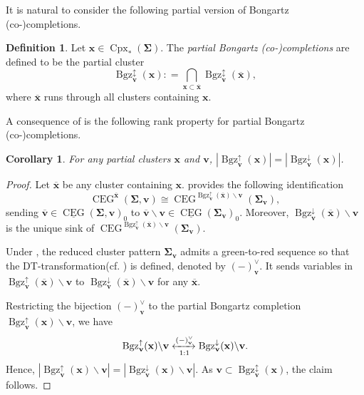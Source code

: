 \documentclass[11pt,reqno]{amsart}
\providecommand{\xlongleftrightarrow}[2][]{\xleftrightarrow[#1]{#2}}
\theoremstyle{plain}
\newtheorem{corollary}[theorem]{Corollary}
\theoremstyle{definition}
\newtheorem{definition}[theorem]{Definition}
\numberwithin{equation}{section}
\newcommand\<{\langle}
\renewcommand\>{\rangle}
\newcommand{\CEG}{\operatorname{CEG}} %
\newcommand{\uCEG}{\underline{\CEG}} %
\newcommand{\on}[1]{\operatorname{#1}}
\def\CCx{\on{Cpx}}   %
\def\vv{\mathbf{v}}
\def\seeds{\mathbf{\Sigma}}
\def\xx{\mathbf{x}}%
\newcommand{\Bgzp}[2]{\operatorname{Bgz}^{\uparrow}_{#2}(#1)}
\newcommand{\Bgzm}[2]{\operatorname{Bgz}^{\downarrow}_{#2}(#1)}
\newcommand{\Bgzpm}[2]{\operatorname{Bgz}^{\updownarrow}_{#2}(#1)}
\newcommand{\ol}[1]{\overline{#1}}
\newcommand{\DT}[1]{#1^{\vee}}
\begin{document}
It is natural to consider the following partial version of Bongartz (co-)completions.

\begin{definition}\label{def:parBgz}
Let $\xx\in\CCx_*(\seeds)$.
The \emph{partial Bongartz (co-)completions} are defined to be the partial cluster
\begin{equation}\label{eq:parBgz2}
    \Bgzpm{\xx}{\vv} \colon =\bigcap_{\xx\subset\ol{\xx}}\Bgzpm{\ol{\xx}}{\vv},
\end{equation}
where $\ol{\xx}$ runs through all clusters containing $\xx$.
\end{definition}

A consequence of  is the following rank property for partial Bongartz (co-)completions.

\begin{corollary}\label{cor:rank}
For any partial clusters $\xx$ and $\vv$, $|\Bgzp{\xx}{\vv}|=|\Bgzm{\xx}{\vv}|$.
\end{corollary}

\begin{proof}
Let $\ol{\xx}$ be any cluster containing $\xx$.
 provides the following identification
\[
\CEG^{\ol{\xx}}(\seeds,\vv)\cong\CEG^{\Bgzp{\ol{\xx}}{\vv}\backslash\vv}(\seeds_\vv),
\]
sending $\ol{\vv}\in\uCEG(\seeds,\vv)_0$ to $\ol{\vv}\backslash\vv\in\uCEG(\seeds_\vv)_0$.
Moreover, $\Bgzm{\ol{\xx}}{\vv}\backslash\vv$ is the unique sink of $\CEG^{\Bgzp{\ol{\xx}}{\vv}\backslash\vv}(\seeds_\vv)$.

Under , the reduced cluster pattern $\seeds_\vv$ admits a green-to-red sequence so that the DT-transformation(cf. ) is defined, denoted by $\DT{(-)_\vv}$.
It sends variables in $\Bgzp{\ol{\xx}}{\vv}\backslash\vv$ to $\Bgzm{\ol{\xx}}{\vv}\backslash\vv$ for any $\ol{\xx}$.

Restricting the bijection $\DT{(-)_\vv}$ to the partial Bongartz completion $\Bgzp{\xx}{\vv}\backslash\vv$, we have
\begin{gather}\label{eq:Bgz-DT}
    \Bgzp{\xx}{\vv}\backslash\vv
    \xlongleftrightarrow[1:1]{\DT{(-)_\vv}}
    {\Bgzm{{\xx}}{\vv}\backslash\vv}.
\end{gather}
Hence, $|\Bgzp{\xx}{\vv}\backslash\vv|=|\Bgzm{\xx}{\vv}\backslash\vv|$.
As $\vv\subset\Bgzpm{\xx}{\vv}$, the claim follows.
\end{proof}
\end{document}
